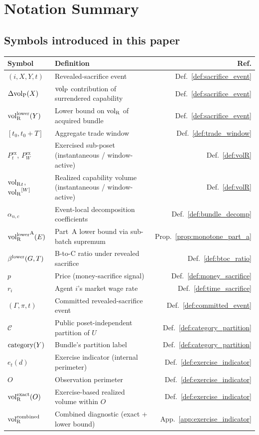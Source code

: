 \section{Notation Summary}
\label{app:notation}

\subsection{Symbols introduced in this paper}

\begin{center}
\small
\begin{tabular}{@{}llr@{}}
\toprule
\textbf{Symbol} & \textbf{Definition} & \textbf{Ref.} \\
\midrule
$(i, X, Y, t)$ & Revealed-sacrifice event
  & Def.~\ref{def:sacrifice_event} \\
$\Delta{\operatorname{vol}_{\mathrm{P}}}(X)$ & ${\operatorname{vol}_{\mathrm{P}}}$ contribution of surrendered
  capability
  & Def.~\ref{def:sacrifice_event} \\
${\operatorname{vol}_{\mathrm{R}}^{\mathrm{lower}}}(Y)$ & Lower bound on ${\operatorname{vol}_{\mathrm{R}}}$ of acquired bundle
  & Def.~\ref{def:sacrifice_event} \\
$[t_0, t_0 + T]$ & Aggregate trade window
  & Def.~\ref{def:trade_window} \\
$P^{\mathrm{ex}}_t$, $P^{\mathrm{ex}}_W$
  & Exercised sub-poset (instantaneous / window-active)
  & Def.~\ref{def:volR} \\
${\operatorname{vol}_{\mathrm{R}}}_t$, ${\operatorname{vol}_{\mathrm{R}}}^{[W]}$
  & Realized capability volume (instantaneous /
  window-active)
  & Def.~\ref{def:volR} \\
$\alpha_{n,c}$ & Event-local decomposition coefficients
  & Def.~\ref{def:bundle_decomp} \\
${\operatorname{vol}_{\mathrm{R}}^{\mathrm{lower}}}^{\mathrm{A}}(E)$ & Part~A lower bound via sub-batch
  supremum
  & Prop.~\ref{prop:monotone_part_a} \\
$\beta^{\mathrm{lower}}(G, T)$ & B-to-C ratio under revealed sacrifice
  & Def.~\ref{def:btoc_ratio} \\
$p$ & Price (money-sacrifice signal)
  & Def.~\ref{def:money_sacrifice} \\
$r_i$ & Agent $i$'s market wage rate
  & Def.~\ref{def:time_sacrifice} \\
$(\Gamma, \pi, t)$ & Committed revealed-sacrifice event
  & Def.~\ref{def:committed_event} \\
$\mathcal{C}$ & Public poset-independent partition of $U$
  & Def.~\ref{def:category_partition} \\
$\mathrm{category}(Y)$ & Bundle's partition label
  & Def.~\ref{def:category_partition} \\
$e_t(d)$ & Exercise indicator (internal perimeter)
  & Def.~\ref{def:exercise_indicator} \\
$O$ & Observation perimeter
  & Def.~\ref{def:exercise_indicator} \\
${\operatorname{vol}_{\mathrm{R}}^{\mathrm{exact}}}(O)$ & Exercise-based realized volume within $O$
  & Def.~\ref{def:exercise_indicator} \\
${\operatorname{vol}_{\mathrm{R}}^{\mathrm{combined}}}$ & Combined diagnostic (exact + lower bound)
  & App.~\ref{app:exercise_indicator} \\
\bottomrule
\end{tabular}
\end{center}

